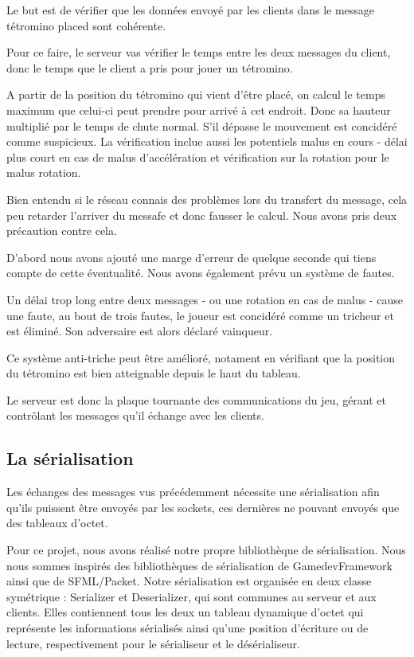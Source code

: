 \documentclass[a4paper, 12pt]{article}
\begin{document}
			Le but est de vérifier que les données envoyé par les clients dans le message tétromino placed sont cohérente. 

			Pour ce faire, le serveur vas vérifier le temps entre les deux messages du client, donc le temps que le client a pris pour jouer un tétromino.

			A partir de la position du tétromino qui vient d'être placé, on calcul le temps maximum que celui-ci peut prendre pour arrivé à cet endroit. Donc sa hauteur multiplié par le temps de chute normal.
			S'il dépasse le mouvement est concidéré comme suspicieux.
			La vérification inclue aussi les potentiels malus en cours - délai plus court en cas de malus d'accélération et vérification sur la rotation pour le malus rotation.

			Bien entendu si le réseau connais des problèmes lors du transfert du message, cela peu retarder l'arriver du messafe et donc fausser le calcul. Nous avons pris deux précaution contre cela. 

			D'abord nous avons ajouté une marge d'erreur de quelque seconde qui tiens compte de cette éventualité. Nous avons également prévu un système de fautes.

			Un délai trop long entre deux messages - ou une rotation en cas de malus - cause une faute, au bout de trois fautes, le joueur est concidéré comme un tricheur et est éliminé. Son adversaire est alors déclaré vainqueur.


			Ce système anti-triche peut être amélioré, notament en vérifiant que la position du tétromino est bien atteignable depuis le haut du tableau.

			Le serveur est donc la plaque tournante des communications du jeu, gérant et contrôlant les messages qu'il échange avec les clients. 

	\subsection{La sérialisation}

		Les échanges des messages vus précédemment nécessite une sérialisation afin qu'ils puissent être envoyés par les sockets, ces dernières ne pouvant envoyés que des tableaux d'octet.

		Pour ce projet, nous avons réalisé notre propre bibliothèque de sérialisation. Nous nous sommes inspirés des bibliothèques de sérialisation de GamedevFramework ainsi que de SFML/Packet. 
		Notre sérialisation est organisée en deux classe symétrique : Serializer et Deserializer, qui sont communes au serveur et aux clients. Elles contiennent tous les deux un tableau dynamique d'octet qui représente les informations sérialisés ainsi qu'une position d'écriture ou de lecture, respectivement pour le sérialiseur et le désérialiseur. 
		
\end{document}
